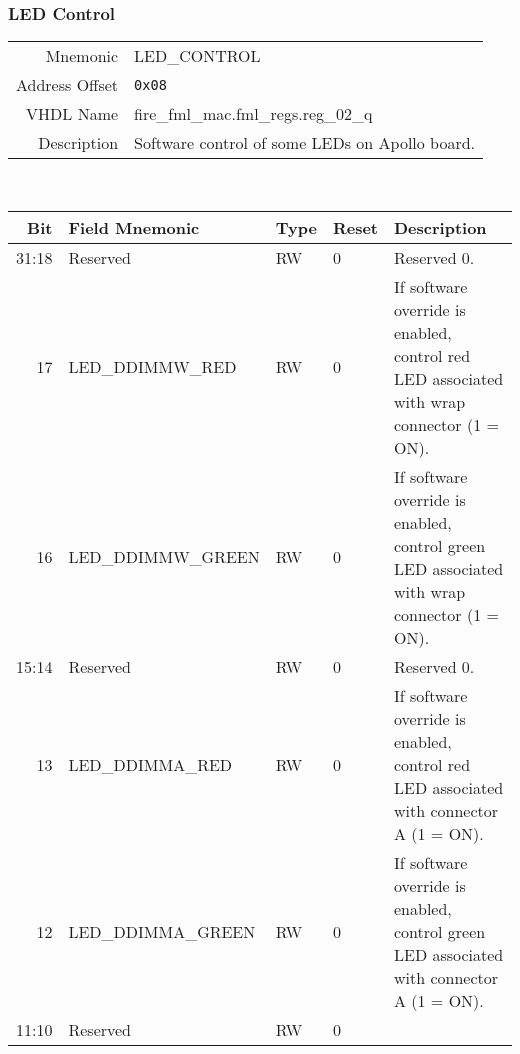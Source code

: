 \subsubsection{LED Control}
\begin{tabular}{ r | p{350px} }
  Mnemonic       & LED\_CONTROL                        \\
  Address Offset & \texttt{0x08}                       \\
  VHDL Name      & fire\_fml\_mac.fml\_regs.reg\_02\_q \\ \hline

  Description &
  Software control of some LEDs on Apollo board. \\
\end{tabular}
\\
\begin{tabularx}{\textwidth}{r|l|l|l|X}
  \hline
  Bit   & Field Mnemonic          & Type & Reset & Description \\ \hline

  31:18 & Reserved                & RW   & 0     &

  Reserved 0. \\

  17    & LED\_DDIMMW\_RED        & RW   & 0     &

  If software override is enabled, control red LED associated with wrap connector (1 = ON). \\

  16    & LED\_DDIMMW\_GREEN      & RW   & 0     &

  If software override is enabled, control green LED associated with wrap connector (1 = ON). \\

  15:14 & Reserved                & RW   & 0     &

  Reserved 0. \\

  13    & LED\_DDIMMA\_RED        & RW   & 0     &

  If software override is enabled, control red LED associated with connector A (1 = ON). \\

  12    & LED\_DDIMMA\_GREEN      & RW   & 0     &

  If software override is enabled, control green LED associated with connector A (1 = ON). \\

  11:10 & Reserved                & RW   & 0     &


\end{tabularx}
